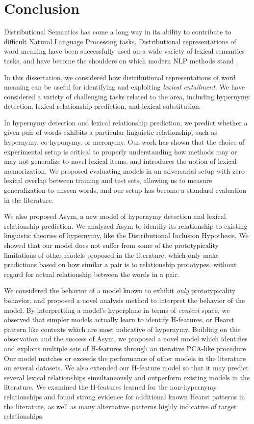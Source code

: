 \chapter{Conclusion}
\label{ch:conclusion}

Distributional Semantics has come a long way in its ability to contribute
to difficult Natural Language Processing tasks. Distributional representations
of word meaning have been successfully used on a wide variety of lexical semantics
tasks, and have become the shoulders on which modern NLP methods stand
\cite{goldberg:2016:jair}.

In this dissertation, we considered how distributional representations of word
meaning can be useful for identifying and exploiting {\em lexical entailment}.
We have considered a variety of challenging tasks related to the area,
including hypernymy detection, lexical relationship prediction, and lexical
substitution.

In hypernymy detection and lexical relationship prediction, we predict
whether a given pair of words exhibits a particular linguistic relationship,
such as hypernymy, co-hyponymy, or meronymy.
Our work has shown that the choice of experimental setup is critical to properly
understanding how methods may or may not generalize to novel lexical items,
and introduces the notion of lexical memorization. We proposed evaluating models
in an adversarial setup with zero lexical overlap between training and test
sets, allowing us to measure generalization to unseen words, and our
setup has become a standard evaluation in the literature.

We also proposed Asym, a new model of hypernymy detection and
lexical relationship prediction. We analyzed Asym to identify
its relationship to existing linguistic theories of hypernymy, like the
Distributional Inclusion Hypothesis. We showed that our model does not suffer
from some of the prototypicality limitations of other models proposed in the
literature, which only make predictions based on how similar a pair is to
relationship prototypes, without regard for actual relationship between the
words in a pair.

We considered the behavior of a model known to exhibit {\em only}
prototypicality behavior, and proposed a novel analysis method to interpret the
behavior of the model. By interpretting a model's hyperplane in terms of {\em
context} space, we observed that simpler models actually
learn to identify H-features, or Hearst pattern like contexts which are most
indicative of hypernymy. Building on this observation and the success of
Asym, we proposed a novel model which identifies and exploits multiple sets of
H-features through an iterative PCA-like procedure. Our model matches or
exceeds the performance of other models in the literature on several datasets.
We also extended our H-feature model so that it may predict several lexical
relationships simultaneously and outperform existing models in the literature.
We examined the H-features learned for the non-hypernymy relationships and
found strong evidence for additional known Hearst patterns in the literature,
as well as many alternative patterns highly indicative of target relationships.

